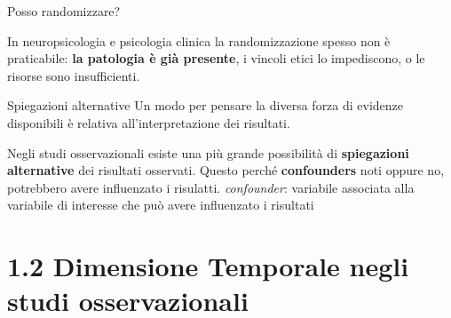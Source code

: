 \documentclass[
  ignorenonframetext,
]{beamer}
\begin{document}
\begin{frame}{Posso randomizzare?}
\label{posso-randomizzare}
\begin{center}
\end{center}
\vspace{0.3em}
\small In neuropsicologia e psicologia clinica la randomizzazione spesso non è praticabile: \textbf{la patologia è già presente}, i vincoli etici lo impediscono, o le risorse sono insufficienti.
\end{frame}

\begin{frame}{Spiegazioni alternative}
\label{spiegazioni-alternative}
Un modo per pensare la diversa forza di evidenze disponibili è relativa
all'interpretazione dei risultati.

Negli studi osservazionali esiste una più grande possibilità di
\textbf{spiegazioni alternative} dei risultati osservati. Questo perché
\textbf{confounders} noti oppure no, potrebbero avere influenzato i
risulatti. \vfill \small \emph{confounder}: variabile associata alla
variabile di interesse che può avere influenzato i risultati
\end{frame}

\section{1.2 Dimensione Temporale negli studi
osservazionali}\label{dimensione-temporale-negli-studi-osservazionali}
\end{document}
